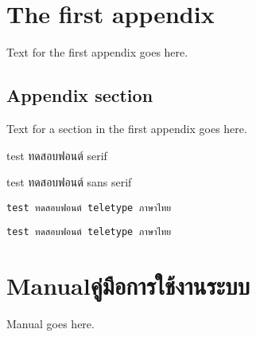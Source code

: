 \chapter{The first appendix}

Text for the first appendix goes here.

\section{Appendix section}

Text for a section in the first appendix goes here.

test ทดสอบฟอนต์ serif

\textsf{test ทดสอบฟอนต์ sans serif}

\verb+test ทดสอบฟอนต์ teletype ภาษาไทย+

\texttt{test ทดสอบฟอนต์ teletype ภาษาไทย}

\chapter{\ifenglish Manual\else คู่มือการใช้งานระบบ\fi}

Manual goes here.
